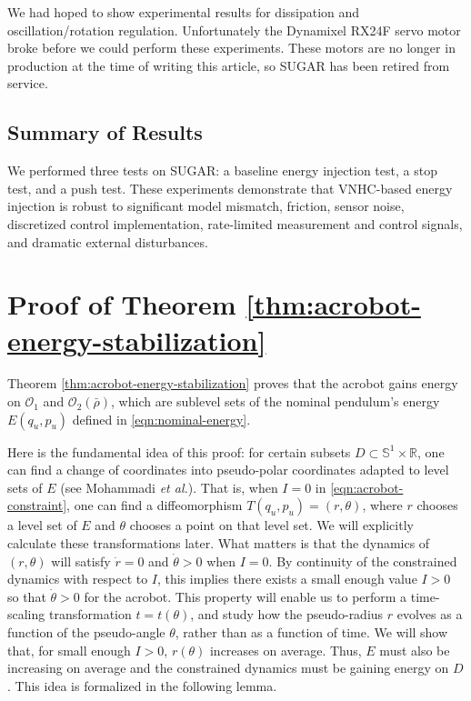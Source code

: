 \documentclass[journal,twoside,web]{ieeecolor}
\newcommand*{\R}{\mathbb{R}}
\newcommand*{\Sone}{\mathbb{S}^1}
\newcommand*{\SxR}{\Sone \times \R}
\newcommand*{\etal}{\MakeLowercase{\textit{et al.}}}
\begin{document}
{We had hoped to show experimental results for dissipation and
oscillation/rotation regulation. 
Unfortunately the Dynamixel RX24F servo motor broke before we could perform
these experiments.
These motors are no longer in production at the time of writing this article, so
SUGAR has been retired from service.

\subsection{Summary of Results} 
We performed three tests on SUGAR: a baseline energy injection test,
a stop test, and a push test.
These experiments demonstrate that VNHC-based energy injection is robust to
significant model mismatch, friction, sensor noise, discretized control
implementation, rate-limited measurement and control signals, and dramatic
external disturbances.

\section{Proof of Theorem \ref{thm:acrobot-energy-stabilization}}\label{sec:proof}
Theorem \ref{thm:acrobot-energy-stabilization} proves that the acrobot gains
energy on \(\mathcal{O}_1\) and \(\mathcal{O}_2(\bar{\rho})\), which are
sublevel sets of the nominal pendulum's energy
\(E(q_u,p_u)\) defined in \eqref{eqn:nominal-energy}.

Here is the fundamental idea of this proof: for certain subsets
\(D \subset \SxR\), one can find a change of coordinates into 
pseudo-polar coordinates adapted to level sets of \(E\) 
(see Mohammadi \etal \cite{dynamic_vhcs_stabilize_closed_orbits}).
That is, when \(I = 0\) in \eqref{eqn:acrobot-constraint}, one can find
a diffeomorphism \(T(q_u,p_u) = (r,\theta)\), where \(r\)
chooses a level set of \(E\) and \(\theta\) chooses a point on that level set.
We will explicitly calculate these transformations later.
What matters is that the dynamics of \((r,\theta)\) will satisfy 
\(\dot{r} = 0\) and \(\dot{\theta} > 0\) when \(I = 0\).
By continuity of the constrained dynamics with respect to \(I\), this implies 
there exists a small enough value \(I > 0\) so that \(\dot{\theta} > 0\) for the
acrobot.
This property will enable us to perform a time-scaling transformation 
\(t = t(\theta)\), and study how the pseudo-radius \(r\) evolves as a function
of the pseudo-angle \(\theta\), rather than as a function of time.
We will show that, for small enough \(I > 0\), \(r(\theta)\) increases on
average.
Thus, \(E\) must also be increasing on average and the constrained dynamics must
be gaining energy on \(D\).
This idea is formalized in the following lemma.

}
\end{document}
